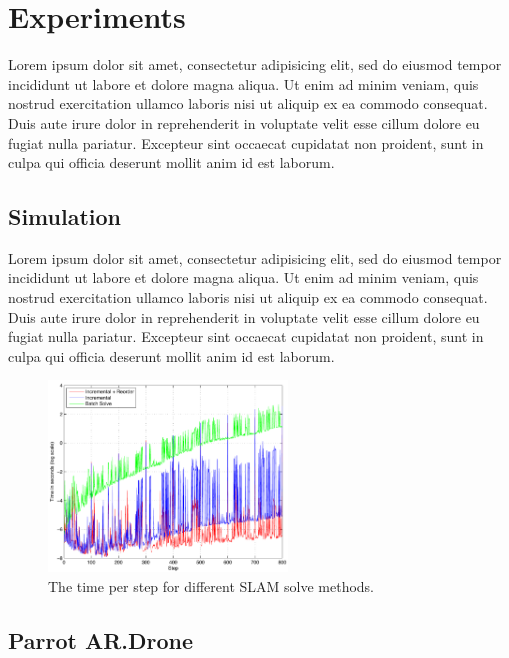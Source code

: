 \documentclass[conference]{IEEEtran}
\begin{document}
\section{Experiments}
\label{sec:experiments}

Lorem ipsum dolor sit amet, consectetur adipisicing elit, sed do eiusmod tempor incididunt
ut labore et dolore magna aliqua. Ut enim ad minim veniam, quis nostrud exercitation
ullamco laboris nisi ut aliquip ex ea commodo consequat. Duis aute irure dolor in
reprehenderit in voluptate velit esse cillum dolore eu fugiat nulla pariatur. Excepteur
sint occaecat cupidatat non proident, sunt in culpa qui officia deserunt mollit anim id
est laborum.


\subsection*{Simulation}
\label{sub:simulation}


Lorem ipsum dolor sit amet, consectetur adipisicing elit, sed do eiusmod tempor incididunt
ut labore et dolore magna aliqua. Ut enim ad minim veniam, quis nostrud exercitation
ullamco laboris nisi ut aliquip ex ea commodo consequat. Duis aute irure dolor in
reprehenderit in voluptate velit esse cillum dolore eu fugiat nulla pariatur. Excepteur
sint occaecat cupidatat non proident, sunt in culpa qui officia deserunt mollit anim id
est laborum.

\begin{figure}[!t]
  \centering
  \includegraphics[width=2.5in]{images/stepTimeResults}
  \caption{The time per step for different SLAM solve methods.}
  \label{fig:stepTime}
\end{figure}


\subsection*{Parrot AR.Drone}
\label{sub:quadrotor}
\end{document}
